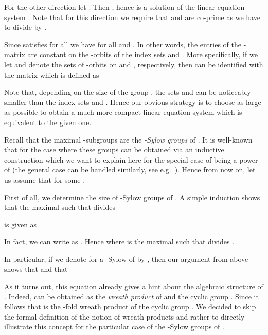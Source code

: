\documentclass[a4paper,UKenglish]{lipics}
\theoremstyle{plain}
\begin{document}
For the other direction let . Then
, hence  is a solution of the
linear equation system . Note that for this 
direction we require that  and  are co-prime as we have to divide by 
.

\smallskip
Since  satisfies  for
all  we have 
 for all  and .
In other words, the entries of the -matrix  are constant 
on the -orbits of the index sets  and . 
More specifically, if we let  and  denote the sets of
-orbits on  and , respectively, then  can
be identified with the matrix  which is defined as 

Note that, depending on the size of the group , the sets 
 and  can be noticeably smaller than the index 
sets  and . 
Hence our obvious strategy is to choose  as large as 
possible to obtain a much more compact linear equation system  which is  equivalent to the given one.

\medskip
Recall that the maximal -subgroups   are 
 the \emph{-Sylow groups} of . 
It is well-known that for the case where  these 
groups can be obtained via an inductive construction which we
want to explain here for the special case of  being a power of  (the 
general case can be handled similarly, see e.g.~\cite{Ha76}). Hence from 
now on, let us assume that  for some .

First of all, we determine the size of -Sylow groups of 
. A simple induction shows that
the maximal  such that   divides 

is given as

In fact, we can write  as .
Hence  where  is the maximal such that 
divides .

In particular, if we denote for  a -Sylow of 
by , then our argument from above shows that  and that


As it turns out, this equation already gives a hint about the algebraic
structure of . Indeed,  can be obtained as the 
\emph{wreath product} of 
 and the cyclic group . Since  
it 
follows that  is the -fold wreath product of the 
cyclic group . We
decided to skip the
formal definition of the notion of wreath products and rather to directly
illustrate this concept for the particular case of the -Sylow groups of 
.
\end{document}
